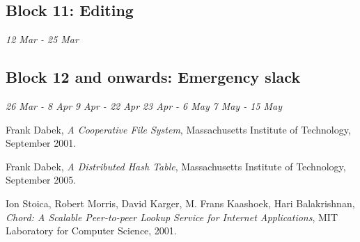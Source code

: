 \documentclass[12pt]{article}
\begin{document}
\subsection{Block 11: Editing}
\emph{12 Mar - 25 Mar} %
\subsection{Block 12 and onwards: Emergency slack}
\emph{26 Mar - 8 Apr}  %
\emph{9 Apr - 22 Apr}  %
\emph{23 Apr - 6 May}  %
\emph{7 May - 15 May}  %

\clearpage
\begin{thebibliography}{9}

  Frank Dabek,
  \emph{A Cooperative File System},
  Massachusetts Institute of Technology,
  September 2001.

  Frank Dabek,
  \emph{A Distributed Hash Table},
  Massachusetts Institute of Technology,
  September 2005.

  Ion Stoica, Robert Morris, David Karger, M. Frans Kaashoek, Hari Balakrishnan,
  \emph{Chord: A Scalable Peer-to-peer Lookup Service for Internet Applications},
  MIT Laboratory for Computer Science,
  2001.

\end{thebibliography}
\end{document}
